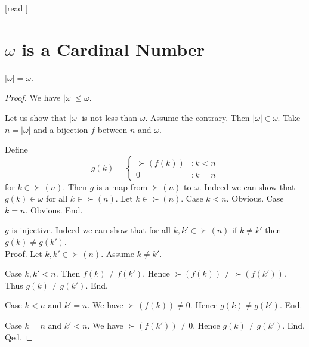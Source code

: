 \documentclass[10pt]{article}
\begin{document}
  \begin{imports}
    \begin{forthel}
      [read ]
    \end{forthel}
  \end{imports}


  \section*{$\omega$ is a Cardinal Number}

  \begin{forthel}
    \begin{proposition}[id=SET_THEORY_07_4952029518626816,printid]
      $|\omega| = \omega$.
    \end{proposition}
    \begin{proof}
      We have $|\omega| \leq \omega$.

      Let us show that $|\omega|$ is not less than $\omega$.
        Assume the contrary.
        Then $|\omega| \in \omega$.
        Take $n = |\omega|$ and a bijection $f$ between $n$ and $\omega$.

        Define \[ g(k) =
          \begin{cases}
            \succ(f(k)) & : k < n
            \\
            0           & : k = n
          \end{cases} \]
        for $k \in \succ(n)$.
        Then $g$ is a map from $\succ(n)$ to $\omega$.
        Indeed we can show that $g(k) \in \omega$ for all $k \in \succ(n)$.
          Let $k \in \succ(n)$.
          Case $k < n$. Obvious.
          Case $k = n$. Obvious.
        End.

        $g$ is injective.
        Indeed we can show that for all $k, k' \in \succ(n)$ if $k \neq k'$
        then $g(k) \neq g(k')$. \\
        Proof.
          Let $k, k' \in \succ(n)$.
          Assume $k \neq k'$.

          Case $k, k' < n$.
            Then $f(k) \neq f(k')$.
            Hence $\succ(f(k)) \neq \succ(f(k'))$.
            Thus $g(k) \neq g(k')$.
          End.

          Case $k < n$ and $k' = n$.
            We have $\succ(f(k)) \neq 0$.
            Hence $g(k) \neq g(k')$.
          End.

          Case $k = n$ and $k' < n$.
            We have $\succ(f(k')) \neq 0$.
            Hence $g(k) \neq g(k')$.
          End.
        Qed.


\end{proof}
\end{forthel}
\end{document}
